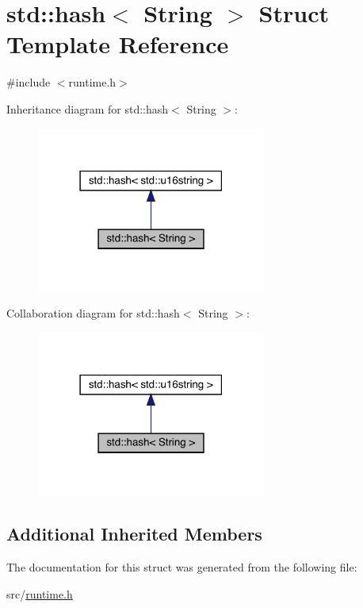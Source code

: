\hypertarget{structstd_1_1hash_3_01_string_01_4}{}\section{std\+:\+:hash$<$ String $>$ Struct Template Reference}
\label{structstd_1_1hash_3_01_string_01_4}


{\ttfamily \#include $<$runtime.\+h$>$}



Inheritance diagram for std\+:\+:hash$<$ String $>$\+:
\nopagebreak
\begin{figure}[H]
\begin{center}
\leavevmode
\includegraphics[width=214pt]{structstd_1_1hash_3_01_string_01_4__inherit__graph}
\end{center}
\end{figure}


Collaboration diagram for std\+:\+:hash$<$ String $>$\+:
\nopagebreak
\begin{figure}[H]
\begin{center}
\leavevmode
\includegraphics[width=214pt]{structstd_1_1hash_3_01_string_01_4__coll__graph}
\end{center}
\end{figure}
\subsection*{Additional Inherited Members}


The documentation for this struct was generated from the following file\+:\begin{DoxyCompactItemize}
\item 
src/\hyperlink{runtime_8h}{runtime.\+h}\end{DoxyCompactItemize}
